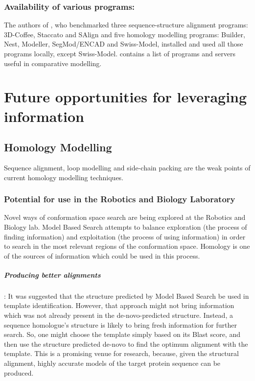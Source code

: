 \documentclass[10pt]{report}
\begin{document}
\subsection{Availability of various programs:}

The authors of \cite{dalton07}, who benchmarked three sequence-structure alignment programs: 3D-Coffee, Staccato and SAlign and five homology modelling programs: Builder, Nest, Modeller, SegMod/ENCAD and Swiss-Model, installed and used all those programs locally, except Swiss-Model. \cite{marti-renom2000com} contains a list of programs and servers useful in comparative modelling. 

\chapter{Future opportunities for leveraging information}

\section{Homology Modelling}

Sequence alignment, loop modelling and side-chain packing are the weak points of current homology modelling techniques.

\subsection{Potential  for use in the Robotics and Biology Laboratory}
Novel ways of conformation space search are being explored at the Robotics and Biology lab. Model Based Search attempts to balance exploration (the process of finding information) and exploitation (the process of using information) in order to search in the most relevant regions of the conformation space. \cite{brunette05} Homology is one of the sources of information which could be used in this process.

\paragraph{Producing better alignments}: It was suggested that the structure predicted by Model Based Search be used in template identification. However, that approach might not bring information which was not already present in the de-novo-predicted structure. Instead, a sequence homologue's structure is likely to bring fresh information for further search. So, one might choose the template simply based on its Blast score, and then use the structure predicted de-novo to find the optimum alignment with the template. This is a promising venue for research, because, given the structural alignment, highly accurate models of the target protein sequence can be produced. \cite{zhang05}
\end{document}

